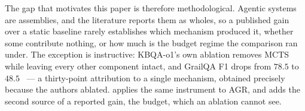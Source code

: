 The gap that motivates this paper is therefore methodological. Agentic
systems are assemblies, and the literature reports them as wholes, so a
published gain over a static baseline rarely establishes which mechanism
produced it, whether some contribute nothing, or how much is the budget
regime the comparison ran under. The exception is instructive: KBQA-o1's
own ablation removes MCTS while leaving every other component intact,
and GrailQA F1 drops from $78.5$ to $48.5$~\cite{luo2025kbqao1} --- a
thirty-point attribution to a single mechanism, obtained precisely
because the authors ablated.  applies the same
instrument to AGR, and  adds the second source of a
reported gain, the budget, which an ablation cannot see.
